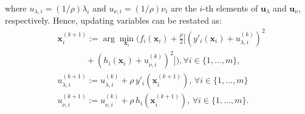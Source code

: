 \documentclass[lang=cn,10pt]{gorgeousnbook}
\numberwithin{equation}{section}%
\numberwithin{figure}{section}%
\begin{document}
where $u_{\lambda,i} = (1/\rho) \lambda_i$ and $u_{\nu,i} = (1/\rho) \nu_i$ are the $i$-th elements of $\boldsymbol{u}_\lambda$ and $\boldsymbol{u}_\nu$, respectively. 
Hence, updating variables can be restated as:
\begin{align}
& \boldsymbol{x}_i^{(k+1)} := \arg\min_{\boldsymbol{x}_i} \Big(f_i(\boldsymbol{x}_i) + \frac{\rho}{2} \big[(y'_i(\boldsymbol{x}_i) + u_{\lambda,i}^{(k)})^2 \nonumber \\
&~~~~~~~~~~~~~~~+ (h_i(\boldsymbol{x}_i) + u_{\nu,i}^{(k)})^2\big] \Big), \forall i \in \{1, \dots, m\}, \label{equation_ADMM_x_i_update2_general} \\
& u_{\lambda,i}^{(k+1)} := u_{\lambda,i}^{(k)} + \rho\, y'_i(\boldsymbol{x}_i^{(k+1)}),\, \forall i \in \{1, \dots, m\} \label{equation_ADMM_u_lambda_update2_general} \\
& u_{\nu,i}^{(k+1)} := u_{\nu,i}^{(k)} + \rho\, h_i(\boldsymbol{x}_i^{(k+1)}),\, \forall i \in \{1, \dots, m\}. \label{equation_ADMM_u_nu_update2_general}
\end{align}

\end{document}
